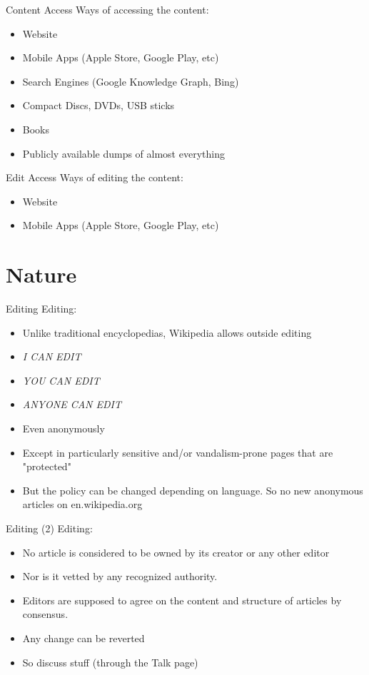 \documentclass{beamer}
\begin{document}
\begin{frame} {Content Access}
	Ways of accessing the content:
	\begin{itemize}
		\pause \item Website
		\pause \item Mobile Apps (Apple Store, Google Play, etc)
		\pause \item Search Engines (Google Knowledge Graph, Bing)
		\pause \item Compact Discs, DVDs, USB sticks
		\pause \item Books
		\pause \item Publicly available dumps of almost everything
	\end{itemize}
\end{frame}

\begin{frame} {Edit Access}
	Ways of editing the content:
	\begin{itemize}
		\pause \item Website
		\pause \item Mobile Apps (Apple Store, Google Play, etc)
	\end{itemize}
\end{frame}

\section{Nature}
\begin{frame} {Editing}
	Editing:
	\begin{itemize}
		\pause \item Unlike traditional encyclopedias, Wikipedia allows outside editing
		\pause \item \emph{I CAN EDIT}
		\pause \item \emph{YOU CAN EDIT}
		\pause \item \emph{ANYONE CAN EDIT}
		\pause \item Even anonymously
		\pause \item Except in particularly sensitive and/or vandalism-prone pages that are "protected"
		\pause \item But the policy can be changed depending on language. So no new anonymous articles on en.wikipedia.org
	\end{itemize}
\end{frame}
\begin{frame} {Editing (2)}
	Editing:
	\begin{itemize}
		\pause \item No article is considered to be owned by its creator or any other editor
		\pause \item Nor is it vetted by any recognized authority.
		\pause \item Editors are supposed to agree on the content and structure of articles by consensus.
		\pause \item Any change can be reverted
		\pause \item So discuss stuff (through the Talk page)
	\end{itemize}
\end{frame}
\end{document}
